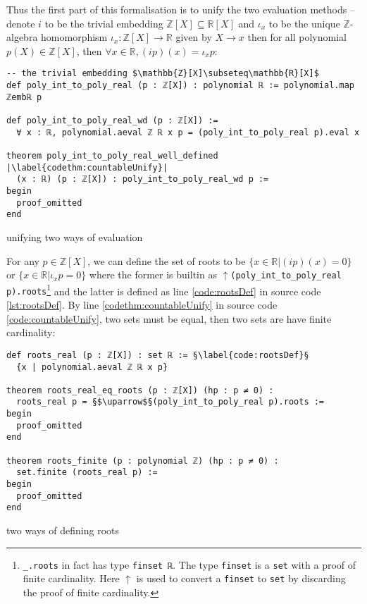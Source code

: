 \documentclass{report}
\theoremstyle{definition}
\theoremstyle{plain}
\newenvironment{code}{\captionsetup{type=listing}}{}
\begin{document}
Thus the first part of this formalisation is to unify the two evaluation methods -- denote $i$ to be the trivial embedding $\mathbb Z[X]\subseteq\mathbb R[X]$ and $\iota_x$ to be the unique $\mathbb Z$-algebra homomorphism $\iota_x : \mathbb Z[X]\to\mathbb R$ given by $X\to x$ then for all polynomial $p(X)\in\mathbb Z[X]$, then $\forall x\in\mathbb R,(i p)(x) = \iota_x p$:

\begin{code}
\begin{verbatim}
-- the trivial embedding $\mathbb{Z}[X]\subseteq\mathbb{R}[X]$
def poly_int_to_poly_real (p : ℤ[X]) : polynomial ℝ := polynomial.map ℤembℝ p
    
def poly_int_to_poly_real_wd (p : ℤ[X]) := 
  ∀ x : ℝ, polynomial.aeval ℤ ℝ x p = (poly_int_to_poly_real p).eval x
    
theorem poly_int_to_poly_real_well_defined |\label{codethm:countableUnify}|
  (x : ℝ) (p : ℤ[X]) : poly_int_to_poly_real_wd p :=
begin
  proof_omitted
end
\end{verbatim}
\caption{unifying two ways of evaluation}
\label{code:countableUnify}
\end{code}

For any $p\in\mathbb Z[X]$, we can define the set of roots to be $\{x \in\mathbb R | (i p)(x) = 0\}$ or $\{x\in\mathbb R| \iota_x p=0\}$ where the former is builtin as {\tt $\uparrow$(poly\_int\_to\_poly\_real p).roots}\footnote{{\tt \_.roots} in fact has type {\tt finset ℝ}. The type {\tt finset} is a {\tt set} with a proof of finite cardinality. Here $\uparrow$ is used to convert a {\tt finset} to {\tt set} by discarding the proof of finite cardinality.} and the latter is defined as line \ref{code:rootsDef} in source code \ref{lst:rootsDef}. By line \ref{codethm:countableUnify} in source code \ref{code:countableUnify}, two sets must be equal, then two sets are have finite cardinality:

\begin{code}
\begin{verbatim}
def roots_real (p : ℤ[X]) : set ℝ := §\label{code:rootsDef}§
  {x | polynomial.aeval ℤ ℝ x p}

theorem roots_real_eq_roots (p : ℤ[X]) (hp : p ≠ 0) : 
  roots_real p = §$\uparrow$§(poly_int_to_poly_real p).roots :=
begin
  proof_omitted
end

theorem roots_finite (p : polynomial ℤ) (hp : p ≠ 0) : 
  set.finite (roots_real p) :=
begin
  proof_omitted
end
\end{verbatim}
\caption{two ways of defining roots}
\label{lst:rootsDef}
\end{code}
\end{document}
